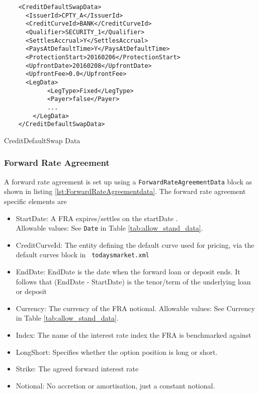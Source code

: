 \begin{listing}[H]
\begin{verbatim}
    <CreditDefaultSwapData>
      <IssuerId>CPTY_A</IssuerId>
      <CreditCurveId>BANK</CreditCurveId>
      <Qualifier>SECURITY_1</Qualifier>
      <SettlesAccrual>Y</SettlesAccrual>
      <PaysAtDefaultTime>Y</PaysAtDefaultTime>
      <ProtectionStart>20160206</ProtectionStart>
      <UpfrontDate>20160208</UpfrontDate>
      <UpfrontFee>0.0</UpfrontFee>
      <LegData>
            <LegType>Fixed</LegType>
            <Payer>false</Payer>
            ...
        </LegData>
    </CreditDefaultSwapData>
\end{verbatim}
\caption{CreditDefaultSwap Data}
\label{lst:cdsdata}
\end{listing}

\subsubsection{Forward Rate Agreement}

A forward rate agreement is set up using a {\tt ForwardRateAgreementData} block as shown in listing \ref{lst:ForwardRateAgreementdata}. The forward rate agreement specific elements
are

\begin{itemize}
\item StartDate: A FRA expires/settles on the startDate . \\ Allowable values:  See \lstinline!Date! in Table \ref{tab:allow_stand_data}.\item CreditCurveId: The entity defining the default curve used for pricing, via the default curves block in {\tt
    todaysmarket.xml}
\item EndDate: EndDate is the date when the forward loan or deposit ends. It follows that (EndDate - StartDate) is the tenor/term of the underlying loan or deposit
\item Currency: The currency of the FRA notional.  	
	Allowable values:  See Currency in Table \ref{tab:allow_stand_data}.	
\item Index: The name of the interest rate index the FRA is benchmarked against
\item LongShort: Specifies whether the option position is long  or
  short.
\item Strike: The agreed forward interest rate
\item Notional: No accretion or amortisation, just a constant notional.
\end{itemize}


